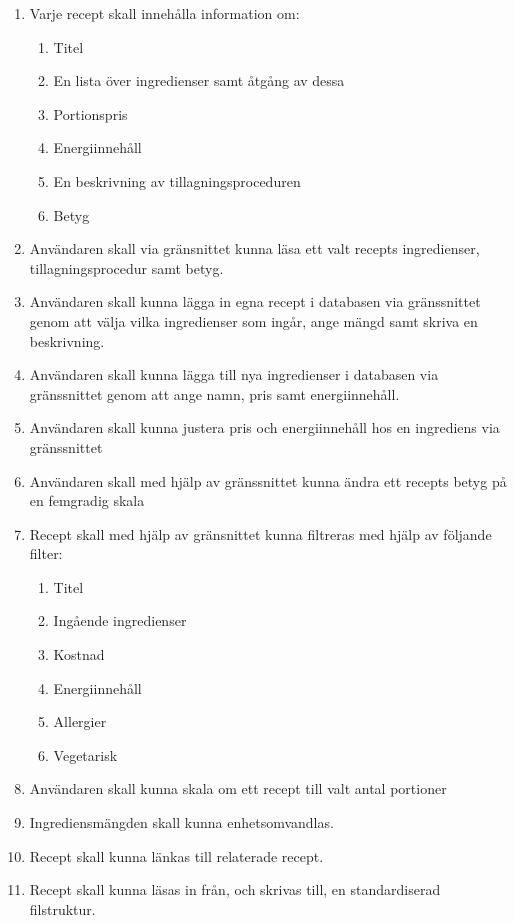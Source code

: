 \renewcommand{\labelenumii}{\theenumii}
\renewcommand{\theenumii}{\theenumi.\arabic{enumii}.}

\begin{enumerate}
\item Varje recept skall innehålla information om:
  \begin{enumerate}
    \item Titel
    \item En lista över ingredienser samt åtgång av dessa
    \item Portionspris
    \item Energiinnehåll
    \item En beskrivning av tillagningsproceduren
    \item Betyg
  \end{enumerate}
\item Användaren skall via gränsnittet kunna läsa ett valt recepts ingredienser, tillagningsprocedur samt betyg.
\item Användaren skall kunna lägga in egna recept i databasen via gränssnittet genom att välja vilka ingredienser som ingår, ange mängd samt skriva en beskrivning.
\item Användaren skall kunna lägga till nya ingredienser i databasen via gränssnittet genom att ange namn, pris samt energiinnehåll.
\item Användaren skall kunna justera pris och energiinnehåll hos en ingrediens via gränssnittet
\item Användaren skall med hjälp av gränssnittet kunna ändra ett recepts betyg på en femgradig skala
\item Recept skall med hjälp av gränsnittet kunna filtreras med hjälp av följande filter:
  \begin{enumerate}
    \item Titel
    \item Ingående ingredienser
    \item Kostnad
    \item Energiinnehåll
    \item Allergier
    \item Vegetarisk
  \end{enumerate}
\item Användaren skall kunna skala om ett recept till valt antal portioner
\item Ingrediensmängden skall kunna enhetsomvandlas.
\item Recept skall kunna länkas till relaterade recept.
\item Recept skall kunna läsas in från, och skrivas till, en standardiserad filstruktur.
\end{enumerate}
